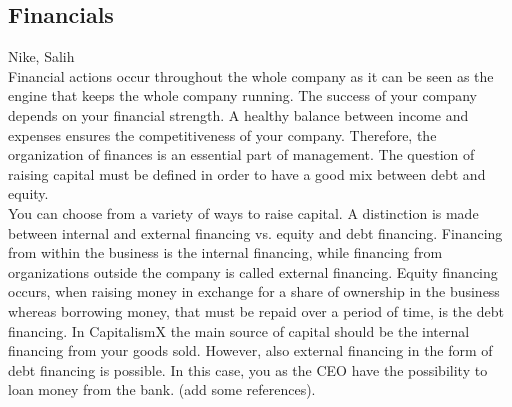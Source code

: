 \subsection{Financials}
Nike, Salih\\

Financial actions occur throughout the whole company as it can be seen as the engine that keeps the whole company running. The success of your company depends on your financial strength. A healthy balance between income and expenses ensures the competitiveness of your company. Therefore, the organization of finances is an essential part of management. The question of raising capital must be defined in order to have a good mix between debt and equity.\\

You can choose from a variety of ways to raise capital. A distinction is made between internal and external financing vs. equity and debt financing.
Financing from within the business is the internal financing, while financing from organizations outside the company is called external financing. Equity financing occurs, when raising money in exchange for a share of ownership in the business whereas borrowing money, that must be repaid over a period of time, is the debt financing. In CapitalismX the main source of capital should be the internal financing from your goods sold. However, also external financing in the form of debt financing is possible. In this case, you as the CEO have the possibility to loan money from the bank. (add some references). \\

